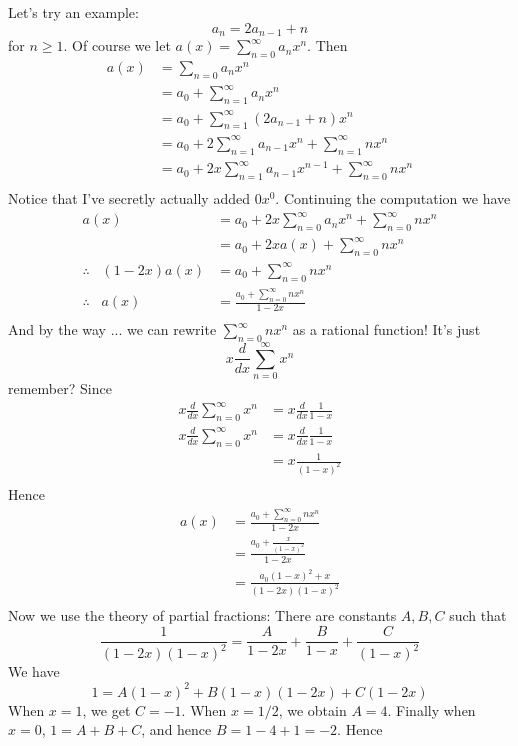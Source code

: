 Let's try an example:
\[
a_n = 2a_{n-1} + n
\]
for $n \geq 1$.
Of course we let $a(x) = \sum_{n=0}^\infty a_n x^n$.
Then
\begin{align*}
a(x) 
&= \sum_{n=0} a_nx^n \\
&= a_0 + \sum_{n = 1}^\infty a_n x^n \\
&= a_0 + \sum_{n = 1}^\infty (2a_{n-1} + n) x^n \\
&= a_0 + 2\sum_{n = 1}^\infty a_{n-1}x^n + \sum_{n=1}^\infty n x^n \\
&= a_0 + 2x\sum_{n = 1}^\infty a_{n-1}x^{n-1} + \sum_{n=0}^\infty n x^n \\
\end{align*}
Notice that I've secretly actually added $0x^0$.
Continuing the computation we have
\begin{align*}
a(x) 
&= a_0 + 2x\sum_{n = 0}^\infty a_{n}x^{n} + \sum_{n=0}^\infty n x^n \\
&= a_0 + 2x a(x) + \sum_{n=0}^\infty n x^n \\
\therefore\,\,\,\,\, (1-2x) a(x) 
&= a_0 + \sum_{n=0}^\infty n x^n \\
\therefore\,\,\,\,\, a(x) 
&= \frac{a_0 + \sum_{n=0}^\infty n x^n}{1-2x} \\
\end{align*}
And by the way ... we can rewrite $\sum_{n=0}^\infty nx^n$ as a
rational function! It's just
\[
x\frac{d}{dx} \sum_{n=0}^\infty x^n
\]
remember?
Since
\begin{align*}
x\frac{d}{dx} \sum_{n=0}^\infty x^n
&= x \frac{d}{dx}\frac{1}{1-x} \\
x\frac{d}{dx} \sum_{n=0}^\infty x^n
&= x \frac{d}{dx} \frac{1}{1-x} \\
&= x \frac{1}{(1-x)^2} \\
\end{align*}
Hence
\begin{align*}
a(x) 
&= \frac{a_0 + \sum_{n=0}^\infty n x^n}{1-2x} \\
&= \frac{a_0 + \frac{x}{(1-x)^2}}{1-2x} \\
&= \frac{a_0(1-x)^2 + x}{(1-2x)(1-x)^2} \\
\end{align*}
Now we use the theory of partial fractions:
There are constants $A, B, C$ such that
\[
\frac{1}{(1-2x)(1-x)^2}
= 
\frac{A}{1-2x}
+
\frac{B}{1-x}
+
\frac{C}{(1-x)^2}
\]
We have
\[
1
= 
A(1-x)^2
+
B(1-x)(1-2x)
+
C(1-2x)
\]
When $x = 1$, we get $C = -1$.
When $x = 1/2$, we obtain $A = 4$.
Finally when $x = 0$, $1 = A + B + C$, and hence
$B = 1 - 4 + 1 = -2$.
Hence
